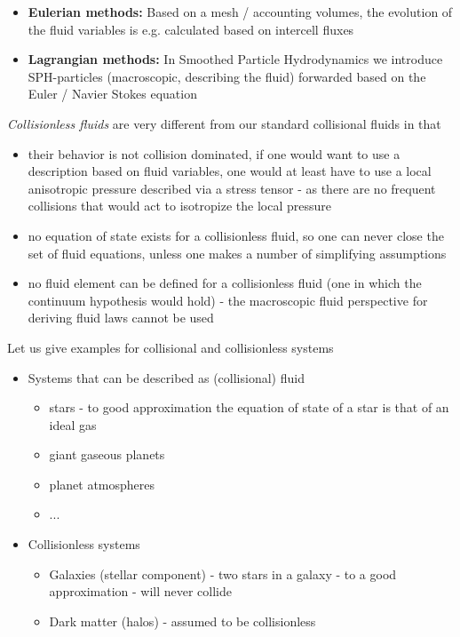 \begin{itemize}
    \item \textbf{Eulerian methods: } Based on a mesh / accounting volumes, the evolution of the fluid variables is e.g. calculated based on intercell fluxes
    \item \textbf{Lagrangian methods: } In Smoothed Particle Hydrodynamics we introduce SPH-particles (macroscopic, describing the fluid) forwarded based on the Euler / Navier Stokes equation
\end{itemize}

\textit{Collisionless fluids} are very different from our standard collisional fluids in that
\begin{itemize}
    \item their behavior is not collision dominated, if one would want to use a description based on fluid variables,
    one would at least have to use a local anisotropic pressure described via a stress tensor - as there are 
    no frequent collisions that would act to isotropize the local pressure
    \item no equation of state exists for a collisionless fluid, so one can never
    close the set of fluid equations, unless one makes a number of simplifying assumptions
    \item no fluid element can be defined for a collisionless fluid (one in which the continuum hypothesis would hold) - the macroscopic fluid perspective
    for deriving fluid laws cannot be used
\end{itemize}

Let us give examples for collisional and collisionless systems

\begin{itemize}
    \item Systems that can be described as (collisional) fluid
    \begin{itemize}
        \item stars - to good approximation the equation of state of a star is that of an ideal gas
        \item giant gaseous planets
        \item planet atmospheres
        \item ...
    \end{itemize}
    \item Collisionless systems
    \begin{itemize}
        \item Galaxies (stellar component) - two stars in a galaxy - to a good approximation - will never collide
        \item Dark matter (halos) - assumed to be collisionless
    \end{itemize}
\end{itemize}

